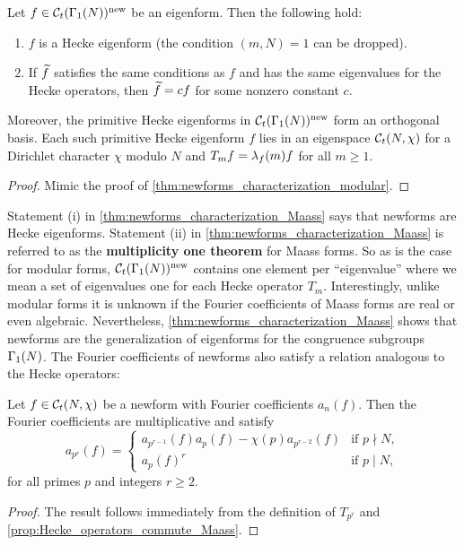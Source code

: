       \begin{theorem}\label{thm:newforms_characterization_Maass}
        Let $f \in \mathcal{C}_{t}(\Gamma_{1}(N))^{\mathrm{new}}$ be an eigenform. Then the following hold:
        \begin{enumerate}[label=(\roman*)]
          \item $f$ is a Hecke eigenform (the condition $(m,N) = 1$ can be dropped).
          \item If $\widetilde{f}$ satisfies the same conditions as $f$ and has the same eigenvalues for the Hecke operators, then $\widetilde{f} = cf$ for some nonzero constant $c$.
        \end{enumerate}
        Moreover, the primitive Hecke eigenforms in $\mathcal{C}_{t}(\Gamma_{1}(N))^{\mathrm{new}}$ form an orthogonal basis. Each such primitive Hecke eigenform $f$ lies in an eigenspace $\mathcal{C}_{t}(N,\chi)$ for a Dirichlet character $\chi$ modulo $N$ and $T_{m}f = \lambda_{f}(m)f$ for all $m \ge 1$.
      \end{theorem}
      \begin{proof}
        Mimic the proof of \cref{thm:newforms_characterization_modular}.
      \end{proof}

      Statement (i) in \cref{thm:newforms_characterization_Maass} says that newforms are Hecke eigenforms. Statement (ii) in \cref{thm:newforms_characterization_Maass} is referred to as the \textbf{multiplicity one theorem} for Maass forms. So as is the case for modular forms, $\mathcal{C}_{t}(\Gamma_{1}(N))^{\mathrm{new}}$ contains one element per ``eigenvalue'' where we mean a set of eigenvalues one for each Hecke operator $T_{m}$. Interestingly, unlike modular forms it is unknown if the Fourier coefficients of Maass forms are real or even algebraic. Nevertheless, \cref{thm:newforms_characterization_Maass} shows that newforms are the generalization of eigenforms for the congruence subgroups $\Gamma_{1}(N)$. The Fourier coefficients of newforms also satisfy a relation analogous to the Hecke operators:

      \begin{proposition}\label{prop:newform_Fourier_coefficient_recurrence_Maass}
        Let $f \in \mathcal{C}_{t}(N,\chi)$ be a newform with Fourier coefficients $a_{n}(f)$. Then the Fourier coefficients are multiplicative and satisfy
        \[
          a_{p^{r}}(f) = \begin{cases} a_{p^{r-1}}(f)a_{p}(f)-\chi(p)a_{p^{r-2}}(f) & \text{if $p \nmid N$}, \\ a_{p}(f)^{r} & \text{if $p \mid N$}, \end{cases}
        \]
        for all primes $p$ and integers $r \ge 2$.
      \end{proposition}
      \begin{proof}
        The result follows immediately from the definition of $T_{p^{r}}$ and \cref{prop:Hecke_operators_commute_Maass}.
      \end{proof}
